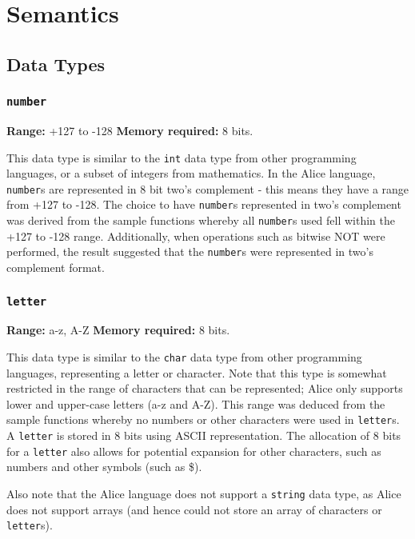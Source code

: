 \documentclass[a4wide, 11pt]{article}
\newcommand{\tab}{\hspace*{2em}}
\begin{document}
\section{Semantics}

\subsection{Data Types}

\subsubsection{\texttt{number}}
{\bf Range:} +127 to -128 {\bf Memory required:} 8 bits.
 
\tab This data type is similar to the \texttt{int} data type from other 
programming languages, or a subset of integers from mathematics. In the Alice 
language, \texttt{number}s are represented in 8 bit two's complement - this
means they have a range from +127 to -128. The choice to have \texttt{number}s
represented in two's complement was derived from the sample functions whereby
all \texttt{number}s used fell within the +127 to -128 range. Additionally, when
operations such as bitwise NOT were performed, the result suggested that the 
\texttt{number}s were represented in two's complement format.

\subsubsection{\texttt{letter}}

{\bf Range:} a-z, A-Z {\bf Memory required:} 8 bits.

\tab This data type is similar to the \texttt{char} data type from other
programming languages, representing a letter or character. Note that this type
is somewhat restricted in the range of characters that can be represented; Alice
only supports lower and upper-case letters (a-z and A-Z). This range was deduced
from the sample functions whereby no numbers or other characters were used in
\texttt{letter}s. A \texttt{letter} is stored in 8 bits using ASCII 
representation. The allocation of 8 bits for a \texttt{letter} also allows for
potential expansion for other characters, such as numbers and other symbols 
(such as \$).

Also note that the Alice language does not support a \texttt{string} data 
type, as Alice does not support arrays (and hence could not store an array of
characters or \texttt{letter}s).
\end{document}
